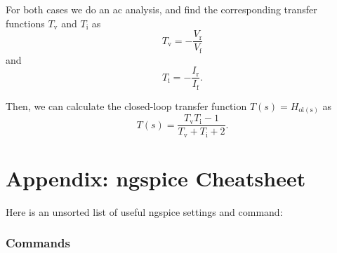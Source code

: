 \documentclass[
  a4paper,
  DIV=11,
  numbers=noendperiod]{scrartcl}
\begin{document}
For both cases we do an ac analysis, and find the corresponding transfer
functions \(T_\mathrm{v}\) and \(T_\mathrm{i}\) as \[
T_\mathrm{v} = -\frac{V_\mathrm{r}}{V_\mathrm{f}}
\] and \[
T_\mathrm{i} = -\frac{I_\mathrm{r}}{I_\mathrm{f}}.
\]

Then, we can calculate the closed-loop transfer function
\(T(s) = H_\mathrm{ol(s)}\) as \[
T(s) = \frac{T_\mathrm{v} T_\mathrm{i} - 1}{T_\mathrm{v} + T_\mathrm{i} + 2}.
\]

\section{Appendix: ngspice
Cheatsheet}\label{appendix-ngspice-cheatsheet}

Here is an unsorted list of useful ngspice settings and command:

\subsubsection{Commands}\label{commands}
\end{document}
